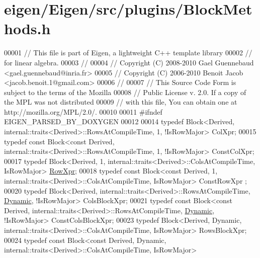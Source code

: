 \hypertarget{eigen_2_eigen_2src_2plugins_2_block_methods_8h_source}{}\section{eigen/\+Eigen/src/plugins/\+Block\+Methods.h}
\label{eigen_2_eigen_2src_2plugins_2_block_methods_8h_source}

\begin{DoxyCode}
00001 \textcolor{comment}{// This file is part of Eigen, a lightweight C++ template library}
00002 \textcolor{comment}{// for linear algebra.}
00003 \textcolor{comment}{//}
00004 \textcolor{comment}{// Copyright (C) 2008-2010 Gael Guennebaud <gael.guennebaud@inria.fr>}
00005 \textcolor{comment}{// Copyright (C) 2006-2010 Benoit Jacob <jacob.benoit.1@gmail.com>}
00006 \textcolor{comment}{//}
00007 \textcolor{comment}{// This Source Code Form is subject to the terms of the Mozilla}
00008 \textcolor{comment}{// Public License v. 2.0. If a copy of the MPL was not distributed}
00009 \textcolor{comment}{// with this file, You can obtain one at http://mozilla.org/MPL/2.0/.}
00010 
00011 \textcolor{preprocessor}{#ifndef EIGEN\_PARSED\_BY\_DOXYGEN}
00012 
00014 \textcolor{keyword}{typedef} Block<Derived, internal::traits<Derived>::RowsAtCompileTime, 1, !IsRowMajor> ColXpr;
00015 \textcolor{keyword}{typedef} \textcolor{keyword}{const} Block<const Derived, internal::traits<Derived>::RowsAtCompileTime, 1, !IsRowMajor> 
      ConstColXpr;
00017 \textcolor{keyword}{typedef} Block<Derived, 1, internal::traits<Derived>::ColsAtCompileTime, IsRowMajor> 
      \hyperlink{group___core___module_class_eigen_1_1_block}{RowXpr};
00018 \textcolor{keyword}{typedef} \textcolor{keyword}{const} Block<const Derived, 1, internal::traits<Derived>::ColsAtCompileTime, IsRowMajor> ConstRowXpr
      ;
00020 \textcolor{keyword}{typedef} Block<Derived, internal::traits<Derived>::RowsAtCompileTime, \hyperlink{namespace_eigen_ad81fa7195215a0ce30017dfac309f0b2}{Dynamic}, !IsRowMajor> 
      ColsBlockXpr;
00021 \textcolor{keyword}{typedef} \textcolor{keyword}{const} Block<const Derived, internal::traits<Derived>::RowsAtCompileTime, 
      \hyperlink{namespace_eigen_ad81fa7195215a0ce30017dfac309f0b2}{Dynamic}, !IsRowMajor> ConstColsBlockXpr;
00023 \textcolor{keyword}{typedef} Block<Derived, Dynamic, internal::traits<Derived>::ColsAtCompileTime, IsRowMajor> RowsBlockXpr;
00024 \textcolor{keyword}{typedef} \textcolor{keyword}{const} Block<const Derived, Dynamic, internal::traits<Derived>::ColsAtCompileTime, IsRowMajor> 

\end{DoxyCode}
